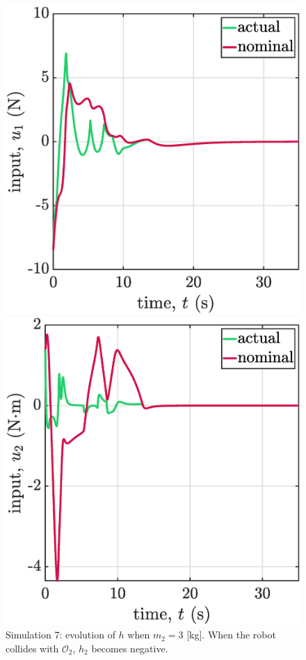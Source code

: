 \begin{figure}[p]
\begin{minipage}[b]{0.45\linewidth}
    \caption{\label{fig:sim7h3}Simulation 7: evolution of $h$ when $m_2=3$ [kg]. When the robot collides with $\mathcal{O}_2$, $h_2$ becomes negative.}
    \end{minipage}
\begin{minipage}[t]{.45\textwidth}
        \centering
        \includegraphics[width=\textwidth]{figures/sim7u1m.eps}
    \end{minipage}
    \hfill
    \begin{minipage}[t]{.45\textwidth}
        \centering
        \includegraphics[width=\textwidth]{figures/sim7u2m.eps}

\end{minipage}
\end{figure}
